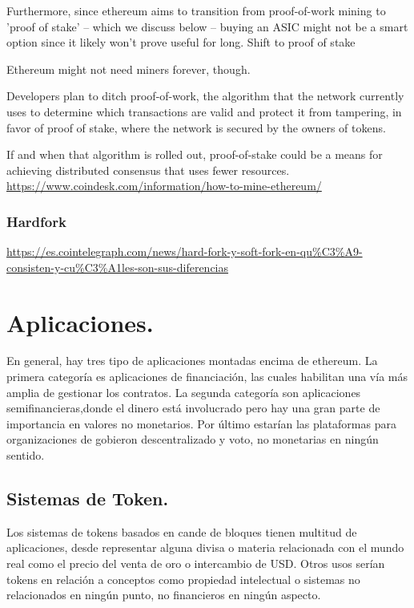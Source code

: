 \documentclass[11pt,a4paper]{article}
\begin{document}
Furthermore, since ethereum aims to transition from proof-of-work mining to 'proof of stake' – which we discuss below – buying an ASIC might not be a smart option since it likely won’t prove useful for long.
Shift to proof of stake

Ethereum might not need miners forever, though.

Developers plan to ditch proof-of-work, the algorithm that the network currently uses to determine which transactions are valid and protect it from tampering, in favor of proof of stake, where the network is secured by the owners of tokens.

If and when that algorithm is rolled out, proof-of-stake could be a means for achieving distributed consensus that uses fewer resources.\\
\url{https://www.coindesk.com/information/how-to-mine-ethereum/}

\subsubsection{Hardfork}
\label{sec:hardfork}
\url{https://es.cointelegraph.com/news/hard-fork-y-soft-fork-en-qu\%C3\%A9-consisten-y-cu\%C3\%A1les-son-sus-diferencias}


\section {Aplicaciones.} 
En general, hay tres tipo de aplicaciones montadas encima de ethereum. La primera categoría es aplicaciones de financiación, las cuales habilitan una vía más amplia de gestionar los contratos. La segunda categoría son aplicaciones semifinancieras,donde el dinero está involucrado pero hay una gran parte de importancia en valores no monetarios. Por último estarían las plataformas para organizaciones de gobieron descentralizado y voto, no monetarias en ningún sentido.

\subsection{Sistemas de Token.}

Los sistemas de tokens basados en cande de bloques tienen multitud de aplicaciones, desde representar alguna divisa o materia relacionada con el mundo real como el precio del venta de oro o intercambio de USD. Otros usos serían tokens en relación a conceptos como propiedad intelectual o sistemas no relacionados en ningún punto, no financieros en ningún aspecto. \\
\end{document}
